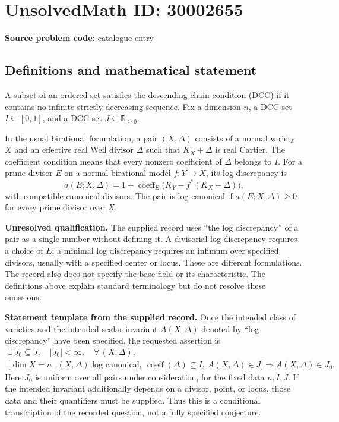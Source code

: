 \documentclass[11pt]{article}
\newcommand{\R}{\mathbb{R}}
\begin{document}
\section*{UnsolvedMath ID: 30002655}
\textbf{Source problem code:} catalogue entry
\subsection{Definitions and mathematical statement}
A subset of an ordered set satisfies the descending chain condition (DCC) if it contains no infinite strictly decreasing sequence. Fix a dimension \(n\), a DCC set \(I\subseteq[0,1]\), and a DCC set \(J\subseteq\R_{\geq0}\).

In the usual birational formulation, a pair \((X,\Delta)\) consists of a normal variety \(X\) and an effective real Weil divisor \(\Delta\) such that \(K_X+\Delta\) is real Cartier. The coefficient condition means that every nonzero coefficient of \(\Delta\) belongs to \(I\). For a prime divisor \(E\) on a normal birational model \(f:Y\to X\), its log discrepancy is
\[
a(E;X,\Delta)=1+\operatorname{coeff}_E\bigl(K_Y-f^*(K_X+\Delta)\bigr),
\]
with compatible canonical divisors. The pair is log canonical if \(a(E;X,\Delta)\geq0\) for every prime divisor over \(X\).

\textbf{Unresolved qualification.} The supplied record uses ``the log discrepancy'' of a pair as a single number without defining it. A divisorial log discrepancy requires a choice of \(E\); a minimal log discrepancy requires an infimum over specified divisors, usually with a specified center or locus. These are different formulations. The record also does not specify the base field or its characteristic. The definitions above explain standard terminology but do not resolve these omissions.

\textbf{Statement template from the supplied record.} Once the intended class of varieties and the intended scalar invariant \(A(X,\Delta)\) denoted by ``log discrepancy'' have been specified, the requested assertion is
\[
\begin{gathered}
\exists\,J_0\subseteq J,\quad |J_0|<\infty,\quad
\forall\,(X,\Delta),\\
\bigl[\dim X=n,\ (X,\Delta)\text{ log canonical},\
\operatorname{coeff}(\Delta)\subseteq I,\ A(X,\Delta)\in J\bigr]
\Longrightarrow A(X,\Delta)\in J_0.
\end{gathered}
\]
Here \(J_0\) is uniform over all pairs under consideration, for the fixed data \(n,I,J\). If the intended invariant additionally depends on a divisor, point, or locus, those data and their quantifiers must be supplied. Thus this is a conditional transcription of the recorded question, not a fully specified conjecture.
\end{document}
